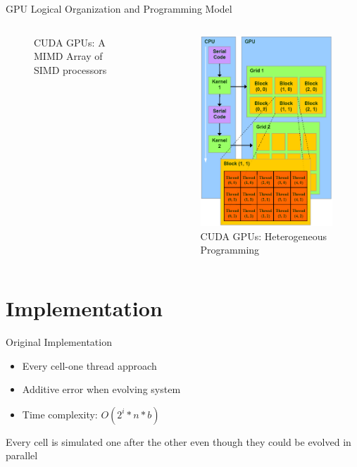 \documentclass[10pt, red]{beamer}
\begin{document}
\begin{frame}{GPU Logical Organization and Programming Model}
\begin{columns}
\begin{figure}
				\caption{CUDA GPUs: A MIMD Array of SIMD processors}
		 	\end{figure} 
			\begin{figure}
				\centering
				\includegraphics[width=\textwidth, height=0.6\textheight]{img/nVidiaExecutionModel}
				\caption{CUDA GPUs: Heterogeneous Programming}
			\end{figure}
		\end{columns}
	\end{frame}


\section{Implementation}
	\begin{frame}{Original Implementation}
		\begin{itemize}
			\item Every cell-one thread approach
			\item Additive error when evolving system
			\item Time complexity: $O(2^i*n*b)$
		\end{itemize}
		Every cell is simulated one after the other even though they could be evolved in parallel
	\end{frame}
\end{document}
